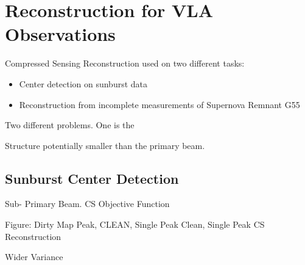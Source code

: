 \section{Reconstruction for VLA Observations}

Compressed Sensing Reconstruction used on two different tasks:
\begin{itemize}
	\item Center detection on sunburst data
	\item Reconstruction from incomplete measurements of Supernova Remnant G55
\end{itemize}

Two different problems. One is the 

Structure potentially smaller than the primary beam.



\subsection{Sunburst Center Detection}

Sub- Primary Beam.
CS Objective Function

Figure: Dirty Map Peak, CLEAN, Single Peak Clean, Single Peak CS Reconstruction

\begin{figure}
	
\end{figure}

Wider Variance


